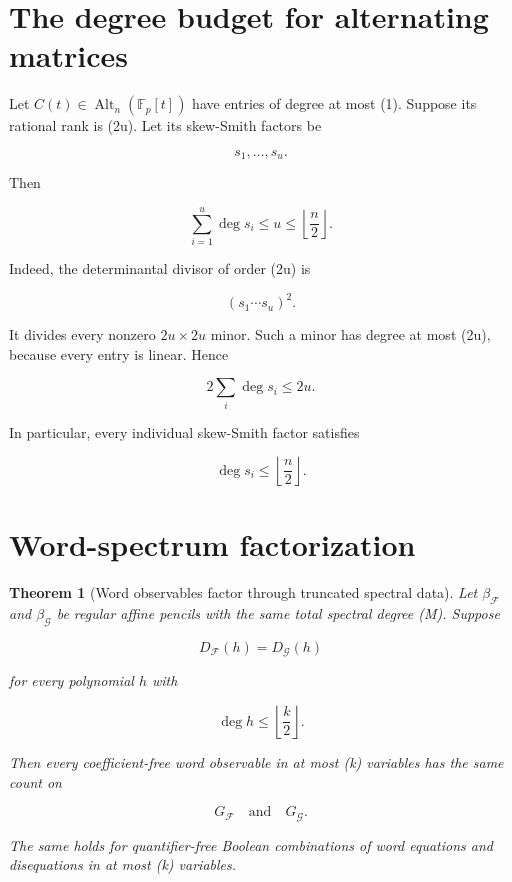 \documentclass[11pt]{article}
\newtheorem{theorem}{Theorem}[section]
\begin{document}
\section{The degree budget for alternating matrices}

Let $C(t)\in\operatorname{Alt}_n(\mathbb F_p[t])$ have entries of degree at most (1). Suppose its rational rank is (2u). Let its skew-Smith factors be

\[
s_1,\ldots,s_u.
\]

Then

\[
\boxed{
\sum_{i=1}^u\deg s_i\le u\le \left\lfloor\frac n2\right\rfloor.
}
\tag{11.1}
\]

Indeed, the determinantal divisor of order (2u) is

\[
(s_1\cdots s_u)^2.
\]

It divides every nonzero $2u\times2u$ minor. Such a minor has degree at most (2u), because every entry is linear. Hence

\[
2\sum_i\deg s_i\le 2u.
\]

In particular, every individual skew-Smith factor satisfies

\[
\deg s_i\le \left\lfloor\frac n2\right\rfloor.
\tag{11.2}
\]

\section{Word-spectrum factorization}

\begin{theorem}[Word observables factor through truncated spectral data]
Let $\beta_{\mathcal F}$ and $\beta_{\mathcal G}$ be regular affine pencils with the same total spectral degree (M). Suppose

\[
D_{\mathcal F}(h)=D_{\mathcal G}(h)
\]

for every polynomial $h$ with

\[
\deg h\le \left\lfloor\frac k2\right\rfloor.
\]

Then every coefficient-free word observable in at most (k) variables has the same count on

\[
G_{\mathcal F}
\quad\text{and}\quad
G_{\mathcal G}.
\]

The same holds for quantifier-free Boolean combinations of word equations and disequations in at most (k) variables.

\end{theorem}
\end{document}
